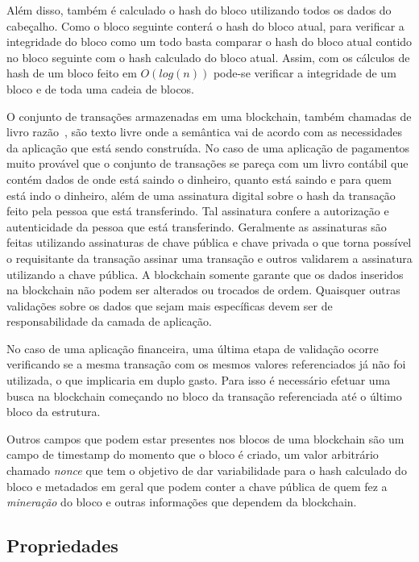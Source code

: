 \documentclass[12pt]{article}
\begin{document}
Além disso, também é calculado o hash do bloco utilizando todos os dados do cabeçalho. Como o bloco seguinte conterá o hash do bloco atual, para verificar a integridade do bloco como um todo basta comparar o hash do bloco atual contido no bloco seguinte com o hash calculado do bloco atual. Assim, com os cálculos de hash de um bloco feito em $O(log(n))$ pode-se verificar a integridade de um bloco e de toda uma cadeia de blocos.

O conjunto de transações armazenadas em uma blockchain, também chamadas de livro razão~\cite{greve2018blockchain}, são texto livre onde a semântica vai de acordo com as necessidades da aplicação que está sendo construída. No caso de uma aplicação de pagamentos muito provável que o conjunto de transações se pareça com um livro contábil que contém dados de onde está saindo o dinheiro, quanto está saindo e para quem está indo o dinheiro, além de uma assinatura digital sobre o hash da transação feito pela pessoa que está transferindo. Tal assinatura confere a autorização e autenticidade da pessoa que está transferindo. Geralmente as assinaturas são feitas utilizando assinaturas de chave pública e chave privada o que torna possível o requisitante da transação assinar uma transação e outros validarem a assinatura utilizando a chave pública. A blockchain somente garante que os dados inseridos na blockchain não podem ser alterados ou trocados de ordem. Quaisquer outras validações sobre os dados que sejam mais específicas devem ser de responsabilidade da camada de aplicação. 

No caso de uma aplicação financeira, uma última etapa de validação ocorre verificando se a mesma transação com os mesmos valores referenciados já não foi utilizada, o que implicaria em duplo gasto. Para isso é necessário efetuar uma busca na blockchain começando no bloco da transação referenciada até o último bloco da estrutura.

Outros campos que podem estar presentes nos blocos de uma blockchain são um campo de timestamp do momento que o bloco é criado, um valor arbitrário chamado \textit{nonce} que tem o objetivo de dar variabilidade para o hash calculado do bloco e metadados em geral que podem conter a chave pública de quem fez a \emph{mineração} do bloco e outras informações que dependem da blockchain\cite{miers2019analise}.

\subsection{Propriedades}
\end{document}
